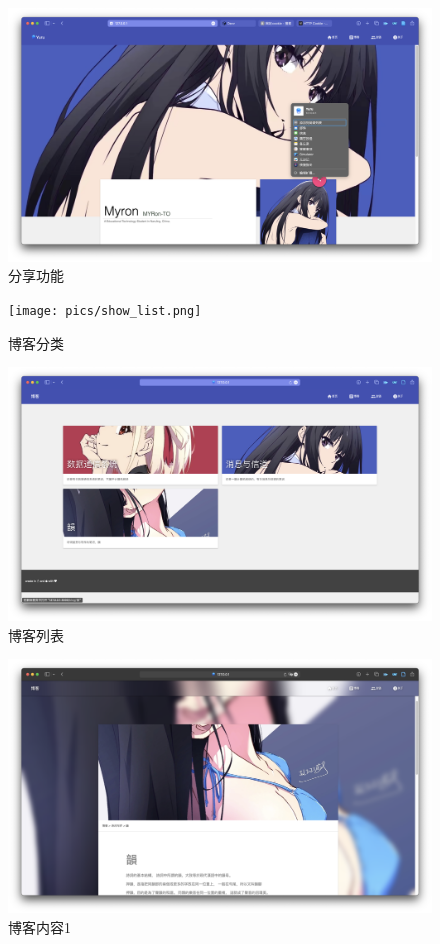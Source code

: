 \documentclass[12pt]{ctexart}
\begin{document}
\begin{figure}[!htb]
	\centering
	\includegraphics[width=1\textwidth]{pics/show_index_share.png}
	\caption{分享功能}
	\label{fig:show_index_share}
\end{figure}

\begin{figure}[!htb]
  \centering
  \texttt{[image: pics/show\_list.png]}
  \caption{博客分类}
  \label{fig:show_list}
\end{figure}

\begin{figure}[!htb]
  \centering
  \includegraphics[width=1\textwidth]{pics/show_list_blog.png}
  \caption{博客列表}
  \label{fig:show_list_blog}
\end{figure}

\begin{figure}[!htb]
  \centering
  \includegraphics[width=1\textwidth]{pics/show_blog.png}
  \caption{博客内容1}
  \label{fig:show_blog_1}
\end{figure}
\end{document}
